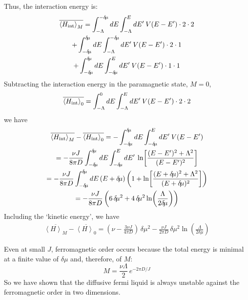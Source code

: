 \documentclass[prb,twocolumn]{revtex4}
\begin{document}
Thus, the interaction energy is:
\begin{multline}
\overline{{\left\langle H_{\rm int}  \right\rangle_M}} = \int^{-\delta\!\mu}_{-\Lambda}dE
\int^{E}_{-\Lambda} dE' \:V(E-E')\cdot2\cdot 2\\
+  \int^{\delta\!\mu}_{-\delta\!\mu}dE
\int^{-\delta\!\mu}_{-\Lambda} dE' \:V(E-E')\cdot 2\cdot 1\\
+  \int^{\delta\!\mu}_{-\delta\!\mu}dE
\int^{E}_{-\delta\!\mu} dE' \:V(E-E')\cdot 1\cdot 1
\end{multline}
Subtracting the interaction energy in the paramagnetic state, $M=0$,
\begin{equation}
\overline{{\left\langle H_{\rm int}  \right\rangle_{0}}} = \int^{0}_{-\Lambda}dE
\int^{E}_{-\Lambda} dE' \:V(E-E')\cdot2\cdot 2
\end{equation}
we have
\begin{multline}
\overline{{\left\langle H_{\rm int}  \right\rangle_M}}-
\overline{{\left\langle H_{\rm int}  \right\rangle_{0}}}
 = -\int^{\delta\!\mu}_{-\delta\!\mu}dE
\int^{E}_{-\delta\!\mu} dE' \:V(E-E')\\
= -\frac{{\nu}J}{8\pi D}\int^{\delta\!\mu}_{-\delta\!\mu}dE
\int^{E}_{-\delta\!\mu} dE'\:  \ln\!\left[\frac{(E-E')^2+\Lambda^2}{(E-E')^2}\right]\\
= -\frac{{\nu}J}{8\pi D}
\int^{\delta\!\mu}_{-\delta\!\mu}dE\,(E+\delta\!\mu)
\left(1+\ln\!\left[\frac{(E+\delta\!\mu)^2+\Lambda^2}{(E+\delta\!\mu)^2}\right]\right)\\
= -\frac{{\nu}J}{8\pi D}\left( 6\, {\delta\!\mu^2} +
4\, {\delta\!\mu^2} \ln\!\left(\frac{\Lambda}{2\delta\!\mu}\right)\right)
\end{multline}
Including the `kinetic energy', we have
\begin{multline}
\overline{{\left\langle H \right\rangle_M}} -
\overline{{\left\langle H  \right\rangle_{0}}}
 = \left(\nu -\frac{3{\nu}J}{4\pi D}\right)\, {\delta\!\mu^2} 
-\frac{{\nu}J}{2\pi D}\, {\delta\!\mu^2} \ln\!\left(\frac{\Lambda}{2\delta\!\mu}\right)
\end{multline}

Even at small $J$, ferromagnetic order occurs because the
total energy is minimal at a finite value of $\delta\!\mu$ and, therefore,
of $M$:
\begin{equation}
M = \frac{\nu \Lambda}{2} \, e^{-{2\pi D}/{J}}
\end{equation}
So we have shown that the diffusive fermi liquid is always
unstable against the ferromagnetic order in two dimensions.
\end{document}
